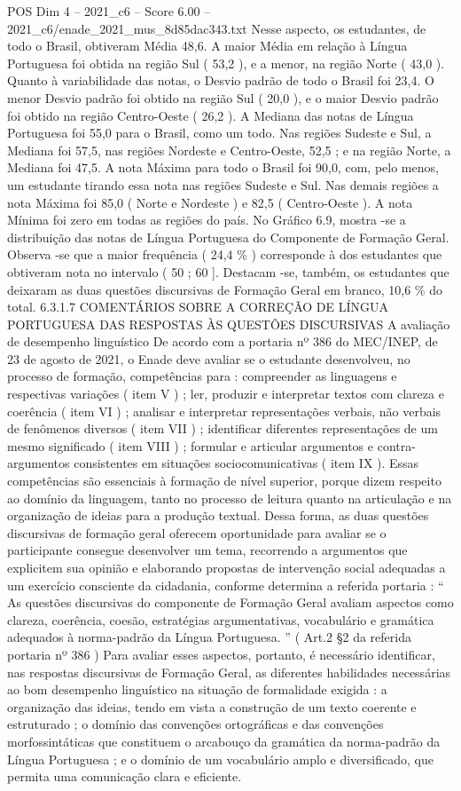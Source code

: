 \begin{textsample}{POS Dim 4 – 2021\_c6 – Score 6.00 – 2021\_c6/enade\_2021\_mus\_8d85dac343.txt}
Nesse aspecto, os estudantes, de todo o Brasil, obtiveram Média 48,6.
A maior Média em relação à Língua Portuguesa foi obtida na região Sul ( 53,2 ), e a menor, na região Norte ( 43,0 ).
Quanto à variabilidade das notas, o Desvio padrão de todo o Brasil foi 23,4.
O menor Desvio padrão foi obtido na região Sul ( 20,0 ), e o maior Desvio padrão foi obtido na região Centro-Oeste ( 26,2 ).
A Mediana das notas de Língua Portuguesa foi 55,0 para o Brasil, como um todo.
Nas regiões Sudeste e Sul, a Mediana foi 57,5, nas regiões Nordeste e Centro-Oeste, 52,5 ; e na região Norte, a Mediana foi 47,5.
A nota Máxima para todo o Brasil foi 90,0, com, pelo menos, um estudante tirando essa nota nas regiões Sudeste e Sul.
Nas demais regiões a nota Máxima foi 85,0 ( Norte e Nordeste ) e 82,5 ( Centro-Oeste ).
A nota Mínima foi zero em todas as regiões do país.
No Gráfico 6.9, mostra -se a distribuição das notas de Língua Portuguesa do Componente de Formação Geral.
Observa -se que a maior frequência ( 24,4 \% ) corresponde à dos estudantes que obtiveram nota no intervalo ( 50 ; 60 ].
Destacam -se, também, os estudantes que deixaram as duas questões discursivas de Formação Geral em branco, 10,6 \% do total. 6.3.1.7 COMENTÁRIOS SOBRE A CORREÇÃO DE LÍNGUA PORTUGUESA DAS RESPOSTAS ÀS QUESTÕES DISCURSIVAS A avaliação de desempenho linguístico De acordo com a portaria nº 386 do MEC/INEP, de 23 de agosto de 2021, o Enade deve avaliar se o estudante desenvolveu, no processo de formação, competências para : compreender as linguagens e respectivas variações ( item V ) ; ler, produzir e interpretar textos com clareza e coerência ( item VI ) ; analisar e interpretar representações verbais, não verbais de fenômenos diversos ( item VII ) ; identificar diferentes representações de um mesmo significado ( item VIII ) ; formular e articular argumentos e contra-argumentos consistentes em situações sociocomunicativas ( item IX ).
Essas competências são essenciais à formação de nível superior, porque dizem respeito ao domínio da linguagem, tanto no processo de leitura quanto na articulação e na organização de ideias para a produção textual.
Dessa forma, as duas questões discursivas de formação geral oferecem oportunidade para avaliar se o participante consegue desenvolver um tema, recorrendo a argumentos que explicitem sua opinião e elaborando propostas de intervenção social adequadas a um exercício consciente da cidadania, conforme determina a referida portaria : “ As questões discursivas do componente de Formação Geral avaliam aspectos como clareza, coerência, coesão, estratégias argumentativas, vocabulário e gramática adequados à norma-padrão da Língua Portuguesa. ” ( Art.2 §2 da referida portaria nº 386 ) Para avaliar esses aspectos, portanto, é necessário identificar, nas respostas discursivas de Formação Geral, as diferentes habilidades necessárias ao bom desempenho linguístico na situação de formalidade exigida : a organização das ideias, tendo em vista a construção de um texto coerente e estruturado ; o domínio das convenções ortográficas e das convenções morfossintáticas que constituem o arcabouço da gramática da norma-padrão da Língua Portuguesa ; e o domínio de um vocabulário amplo e diversificado, que permita uma comunicação clara e eficiente.

\end{textsample}
